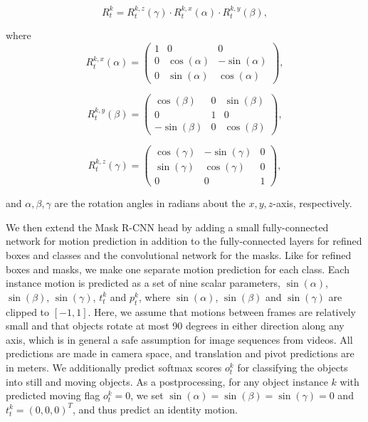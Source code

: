 \begin{equation}
R_t^k = R_t^{k,z}(\gamma) \cdot R_t^{k,x}(\alpha) \cdot R_t^{k,y}(\beta),
\end{equation}

where
\begin{equation}
R_t^{k,x}(\alpha) =
\begin{pmatrix}
  1 & 0 & 0 \\
  0 & \cos(\alpha) & -\sin(\alpha) \\
  0 & \sin(\alpha) & \cos(\alpha)
\end{pmatrix},
\end{equation}

\begin{equation}
R_t^{k,y}(\beta) =
\begin{pmatrix}
  \cos(\beta) & 0 & \sin(\beta) \\
  0 & 1 & 0 \\
  -\sin(\beta) & 0 & \cos(\beta)
\end{pmatrix},
\end{equation}

\begin{equation}
R_t^{k,z}(\gamma) =
\begin{pmatrix}
  \cos(\gamma) & -\sin(\gamma) & 0 \\
  \sin(\gamma) & \cos(\gamma) & 0 \\
  0 & 0 & 1
\end{pmatrix},
\end{equation}

and $\alpha, \beta, \gamma$ are the rotation angles in radians about the $x,y,z$-axis, respectively.

We then extend the Mask R-CNN head by adding a small fully-connected network for motion
prediction in addition to the fully-connected layers for
refined boxes and classes and the convolutional network for the masks.
Like for refined boxes and masks, we make one separate motion prediction for each class.
Each instance motion is predicted as a set of nine scalar parameters,
$\sin(\alpha)$, $\sin(\beta)$, $\sin(\gamma)$, $t_t^k$ and $p_t^k$,
where $\sin(\alpha)$, $\sin(\beta)$ and $\sin(\gamma)$ are clipped to $[-1, 1]$.
Here, we assume that motions between frames are relatively small
and that objects rotate at most 90 degrees in either direction along any axis,
which is in general a safe assumption for image sequences from videos.
All predictions are made in camera space, and translation and pivot predictions are in meters.
We additionally predict softmax scores $o_t^k$ for classifying the objects into
still and moving objects. As a postprocessing, for any object instance $k$ with predicted moving flag $o_t^k = 0$,
we set $\sin(\alpha) = \sin(\beta) = \sin(\gamma) = 0$ and $t_t^k = (0,0,0)^T$,
and thus predict an identity motion.


